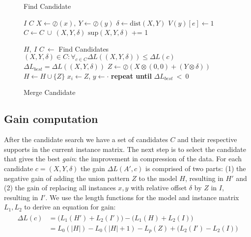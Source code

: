 \documentclass{llncs}
\begin{document}
\begin{figure*}[ttt!]
\begin{minipage}[t]{.45\textwidth}
	\begin{algorithm}[H]
	\caption{Find Candidate}
	\begin{algorithmic}[1]
	\Require $I$
	\Ensure $C$
			\State $X \gets \oslash(x), \ Y \gets \oslash(y)$
			\State $\delta \gets \mathrm{dist}(X,Y)$
				\State $V(y)[e] \gets 1$
			\EndIf
			\State $C \gets C \ \cup \ (X,Y,\delta)$
			\State $\mathrm{sup}(X,Y,\delta)$ += 1
		\EndFor
	\EndFor
	\end{algorithmic}
	\end{algorithm}%
\end{minipage}%
\begin{minipage}[t]{.55\textwidth}
	\begin{algorithm}[H]
	\caption{Merge Candidate}
	\label{alg:vouw}
	\begin{algorithmic}[1]
	\Require $H,\ I$
		\State $C \ \gets$ Find Candidates
		\State $(X,Y,\delta) \in C : \forall_{c \in C} \Delta L((X,Y,\delta)) \leq \Delta L(c)$
	\State $\Delta L_{best} = \Delta L((X,Y,\delta))$
		\State $Z \gets \oslash(X\otimes(0,0) + (Y\otimes\delta))$
		\State $H \gets H \cup \{Z\}$
				\State $x_i \gets Z$,  $y \gets \cdot$
			\EndFor
		\EndFor
	\EndIf
	\State \textbf{repeat until} $\Delta L_{best} \ < \ 0$
	\end{algorithmic}%
	\vspace{-2pt}
	\end{algorithm}
\end{minipage}
\end{figure*}

\subsection{Gain computation}

After the candidate search we have a set of candidates $C$ and their respective supports in the current instance matrix. The next step is to select the candidate that gives the best \emph{gain}: the improvement in compression of the data. For each candidate $c=(X,Y,\delta)$ the gain $\Delta L(A',c)$  is comprised of two parts: (1) the negative gain of adding the union pattern $Z$ to the model $H$, resulting in $H'$ and (2) the gain of replacing all instances $x,y$ with relative offset $\delta$ by $Z$ in $I$, resulting in $I'$. We use the length functions for the model and instance matrix $L_1, L_2$ to derive an equation for gain:
\begin{align}
\label{gain}
\begin{split}
	\Delta L(c) &= \Big(L_1(H') + L_2(I') \Big) - \Big(L_1(H) + L_2(I) \Big) \\
			    &= L_0(|H|) - L_0(|H|+1) - L_p(Z) + \Big(L_2(I') - L_2(I) \Big)
\end{split}
\end{align}
\end{document}
